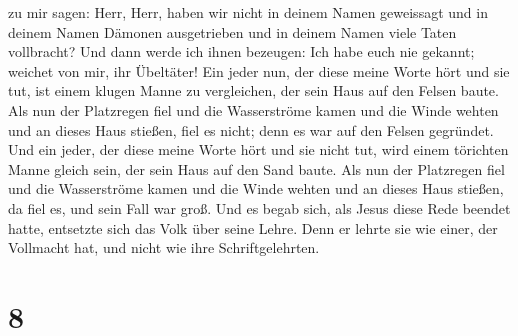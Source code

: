 zu mir sagen: Herr, Herr, haben wir nicht in deinem Namen geweissagt und
in deinem Namen Dämonen ausgetrieben und in deinem Namen viele Taten
vollbracht?  Und dann werde ich ihnen bezeugen: Ich habe
euch nie gekannt; weichet von mir, ihr Übeltäter!  Ein
jeder nun, der diese meine Worte hört und sie tut, ist einem klugen
Manne zu vergleichen, der sein Haus auf den Felsen baute.
 Als nun der Platzregen fiel und die Wasserströme kamen
und die Winde wehten und an dieses Haus stießen, fiel es nicht; denn es
war auf den Felsen gegründet.  Und ein jeder, der diese
meine Worte hört und sie nicht tut, wird einem törichten Manne gleich
sein, der sein Haus auf den Sand baute.  Als nun der
Platzregen fiel und die Wasserströme kamen und die Winde wehten und an
dieses Haus stießen, da fiel es, und sein Fall war groß. 
Und es begab sich, als Jesus diese Rede beendet hatte, entsetzte sich
das Volk über seine Lehre.  Denn er lehrte sie wie einer,
der Vollmacht hat, und nicht wie ihre Schriftgelehrten.

\hypertarget{section-7}{%
\section{8}\label{section-7}}

